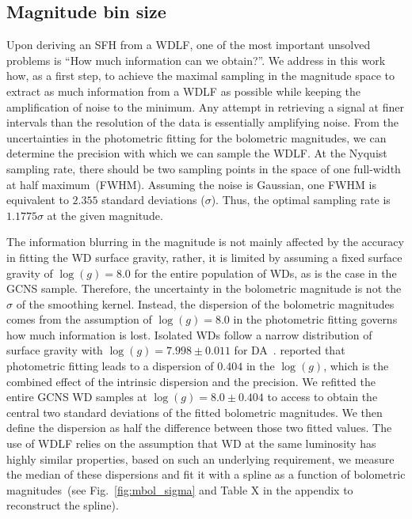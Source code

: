 \documentclass[fleqn,usenatbib]{mnras}
\begin{document}
\subsection{Magnitude bin size}
\label{sec:magnitude_bin_size}
Upon deriving an SFH from a WDLF, one of the most important unsolved problems
is ``How much information can we obtain?''. We address in this work 
how, as a first step, to achieve the maximal sampling in the magnitude
space to extract as much information from a WDLF as possible while keeping
the amplification of noise to the minimum. Any attempt in retrieving a signal
at finer intervals than the resolution of the data is essentially amplifying
noise. From the uncertainties in the photometric fitting for the bolometric
magnitudes, we can determine the precision with which we can sample the WDLF.
At the Nyquist sampling rate, there should be two sampling points in the
space of one full-width at half maximum~(FWHM). Assuming the noise is Gaussian,
one FWHM is equivalent to $2.355$ standard deviations ($\sigma$). Thus, the
optimal sampling rate is $1.1775\sigma$ at the given magnitude.

The information blurring in the magnitude is not mainly affected by the
accuracy in fitting the WD surface gravity, rather, it is limited by assuming
a fixed surface gravity of $\log(g) = 8.0$ for the entire population of
WDs, as is the case in the GCNS sample. Therefore, the uncertainty in the
bolometric magnitude is not the $\sigma$ of the smoothing kernel. Instead,
the dispersion of the bolometric magnitudes comes from the assumption of
$\log(g) = 8.0$ in the photometric fitting governs how much information is
lost. Isolated WDs follow a narrow distribution of surface gravity with
$\log(g)=7.998 \pm 0.011$ for DA~\citep{2021MNRAS.507.4646K}. 
\citet{2014ApJ...791...92T} reported that photometric fitting leads to a
dispersion of $0.404$ in the $\log(g)$, which is the combined effect of the 
intrinsic dispersion and the precision. We refitted the entire GCNS WD samples
at $\log(g) = 8.0 \pm 0.404$ to access to obtain the central two standard
deviations of the fitted bolometric magnitudes. We then define the dispersion
as half the difference between those two fitted values. The use of WDLF
relies on the assumption that WD at the same luminosity has highly similar
properties, based on such an underlying requirement, we measure the median
of these dispersions and fit it with a spline as a function of bolometric
magnitudes~(see Fig.~\ref{fig:mbol_sigma} and Table X in the appendix to
reconstruct the spline).
\end{document}
